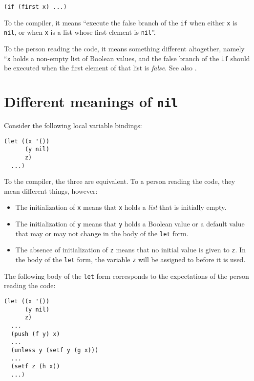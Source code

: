 \begin{verbatim}
(if (first x) ...)
\end{verbatim}

To the compiler, it means ``execute the false branch of the \texttt{if}
when either \texttt{x} is \texttt{nil}, or when \texttt{x} is a list
whose first element is \texttt{nil}''.

To the person reading the code, it means something different
altogether, namely ``\texttt{x} holds a non-empty list of Boolean
values, and the false branch of the \texttt{if} should be executed
when the first element of that list is
\emph{false}. See also .

\section{Different meanings of \texttt{nil}}
\label{sec-coding-style-meanings-of-nil}

Consider the following local variable bindings:

\begin{verbatim}
(let ((x '())
      (y nil)
      z)
  ...)
\end{verbatim}

To the compiler, the three are equivalent.  To a person reading the
code, they mean different things, however:

\begin{itemize}
\item The initialization of \texttt{x} means that \texttt{x} holds a
  \emph{list} that is initially empty.
\item The initialization of \texttt{y} means that \texttt{y} holds a
  Boolean value or a default value that may or may not change in the
  body of the \texttt{let} form.
\item The absence of initialization of \texttt{z} means that no
  initial value is given to \texttt{z}.  In the body of the
  \texttt{let} form, the variable \texttt{z} will be assigned to
  before it is used.
\end{itemize}

The following body of the \texttt{let} form corresponds to the
expectations of the person reading the code:

\begin{verbatim}
(let ((x '())
      (y nil)
      z)
  ...
  (push (f y) x)
  ...
  (unless y (setf y (g x)))
  ...
  (setf z (h x))
  ...)
\end{verbatim}

